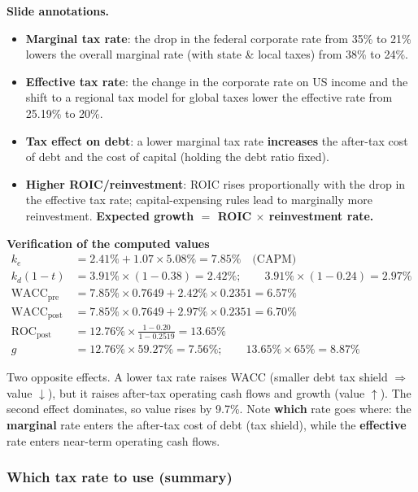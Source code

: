 \begin{exbox}
\medskip
\textbf{Slide annotations.}
\begin{itemize}[leftmargin=*]
  \item \textbf{Marginal tax rate}: the drop in the federal corporate rate from 35\% to 21\% lowers the overall marginal rate (with state \& local taxes) from 38\% to 24\%.
  \item \textbf{Effective tax rate}: the change in the corporate rate on US income and the shift to a regional tax model for global taxes lower the effective rate from 25.19\% to 20\%.
  \item \textbf{Tax effect on debt}: a lower marginal tax rate \textbf{increases} the after-tax cost of debt and the cost of capital (holding the debt ratio fixed).
  \item \textbf{Higher ROIC/reinvestment}: ROIC rises proportionally with the drop in the effective tax rate; capital-expensing rules lead to marginally more reinvestment. \textbf{Expected growth $=$ ROIC $\times$ reinvestment rate.}
\end{itemize}

\medskip
\textbf{Verification of the computed values} \added
\begin{align*}
k_e &= 2.41\% + 1.07\times5.08\% = 7.85\% \quad\text{(CAPM)}\\
k_d(1-t) &= 3.91\%\times(1-0.38)=2.42\%;\qquad 3.91\%\times(1-0.24)=2.97\%\\
\text{WACC}_{\text{pre}} &= 7.85\%\times0.7649+2.42\%\times0.2351=6.57\%\\
\text{WACC}_{\text{post}} &= 7.85\%\times0.7649+2.97\%\times0.2351=6.70\%\\
\text{ROC}_{\text{post}} &= 12.76\%\times\tfrac{1-0.20}{1-0.2519}=13.65\%\\
g &= 12.76\%\times59.27\%=7.56\%;\qquad 13.65\%\times65\%=8.87\%
\end{align*}
\end{exbox}

\begin{addbox}
Two opposite effects. A lower tax rate raises WACC (smaller debt tax shield $\Rightarrow$ value $\downarrow$), but it raises after-tax operating cash flows and growth (value $\uparrow$). The second effect dominates, so value rises by 9.7\%. Note \textbf{which} rate goes where: the \textbf{marginal} rate enters the after-tax cost of debt (tax shield), while the \textbf{effective} rate enters near-term operating cash flows.
\end{addbox}

\subsubsection*{Which tax rate to use (summary)}


